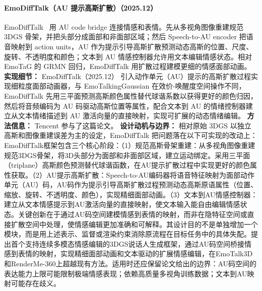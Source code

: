 \paragraph{EmoDiffTalk（AU 提示高斯扩散）（2025.12）}
EmoDiffTalk~\cite{2512_05991} 用 AU code bridge 连接情感和表情。先从多视角图像重建规范 3DGS 骨架，并把头部分成面部和非面部区域；然后 Speech-to-AU encoder 把语音映射到 action units，AU 作为提示引导高斯扩散预测动态高斯的位置、尺度、旋转、不透明度和颜色；文本到 AU 情感控制器允许用文本编辑情感状态。相对 EmoTaG 的 GRMN 回归，EmoDiffTalk 用扩散过程建模更细的情感面部动画。
\textbf{实现细节：} EmoDiffTalk（2025.12） 引入动作单元（AU）提示的高斯扩散过程实现细粒度面部动画器，与 EmoTalkingGaussian 在效价-唤醒度空间操作不同，EmoDiffTalk 先用三平面预测高斯颜色属性替代球谐系数以获得更好的颜色归因，然后将音频编码为 AU 码驱动高斯位置等属性，配合文本到 AU 的情绪控制器建立从文本情绪描述到 AU 激活向量的直接映射，实现可扩展的动态情绪编辑。
\textbf{方法信息：} Tencent 参与了这篇论文。
\textbf{设计动机与边界：} 相对原始 3DGS 以独立高斯和图像重建误差为主的设定，EmoDiffTalk 把问题落在以下可实现的改动上：EmoDiffTalk框架包含三个核心阶段：（1）规范高斯骨架重建：从多视角图像重建规范3DGS骨架，将3D头部分为面部和非面部区域，建立运动绑定。采用三平面（triplane）高斯颜色预测替代球谐函数，在AU提示扩散过程中实现更好的颜色属性获取。（2）AU提示高斯扩散：Speech-to-AU编码器将语音特征映射为面部动作单元（AU）码，AU码作为提示引导高斯扩散过程预测动态高斯原语属性（位置、缩放、旋转、不透明度、颜色），实现精细面部动画。（3）文本到AU情感控制器：建立从文本情感提示到AU激活向量的直接映射，使文本输入能自由编辑情感状态。关键创新在于通过AU码空间建模情感到表情的映射，而非在隐特征空间或直接扩散空间中处理，使情感编辑更加准确和可解释。其设计目的不是单独增加一个模块，而是用上述表示、监督或渲染约束消除原流程在目标任务中的具体失配。提出首个支持连续多模态情感编辑的3DGS说话人生成框架，通过AU码空间桥接情感到表情的映射，实现精细面部动画和文本驱动的扩展情感编辑，在EmoTalk3D和RenderMe-360上超越现有方法。适用时还应保留论文给出的边界：AU码空间的表达能力上限可能限制极端情感表现；依赖高质量多视角训练数据；文本到AU映射可能存在歧义。
